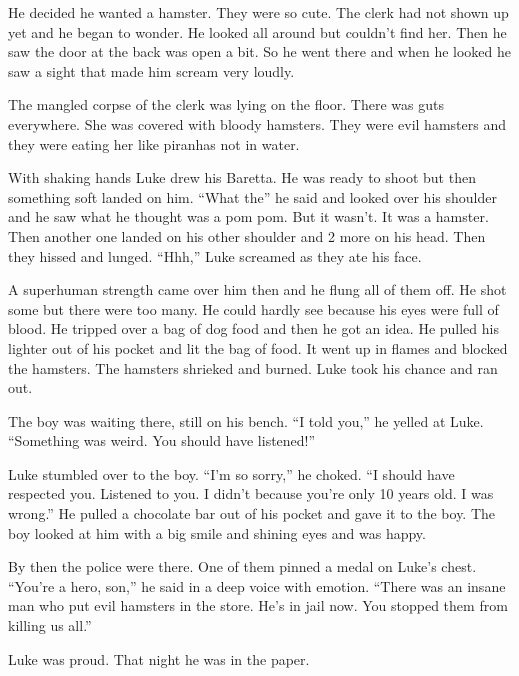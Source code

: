 He decided he wanted a hamster. They were so cute. The clerk had
not shown up yet and he began to wonder. He looked all around but
couldn't find her. Then he saw the door at the back was open a bit.
So he went there and when he looked he saw a sight that made him
scream very loudly.



The mangled corpse of the clerk was lying on the floor. There was
guts everywhere. She was covered with bloody hamsters. They were
evil hamsters and they were eating her like piranhas not in
water.



With shaking hands Luke drew his Baretta. He was ready to shoot but
then something soft landed on him. ``What the'' he said and looked
over his shoulder and he saw what he thought was a pom pom. But it
wasn't. It was a hamster. Then another one landed on his other
shoulder and 2 more on his head. Then they hissed and lunged.
``Hhh,'' Luke screamed as they ate his face.



A superhuman strength came over him then and he flung all of them
off. He shot some but there were too many. He could hardly see
because his eyes were full of blood. He tripped over a bag of dog
food and then he got an idea. He pulled his lighter out of his
pocket and lit the bag of food. It went up in flames and blocked
the hamsters. The hamsters shrieked and burned. Luke took his
chance and ran out.



The boy was waiting there, still on his bench. ``I told you,'' he
yelled at Luke. ``Something was weird. You should have
listened!''



Luke stumbled over to the boy. ``I'm so sorry,'' he choked. ``I should
have respected you. Listened to you. I didn't because you're only
10 years old. I was wrong.'' He pulled a chocolate bar out of his
pocket and gave it to the boy. The boy looked at him with a big
smile and shining eyes and was happy.



By then the police were there. One of them pinned a medal on Luke's
chest. ``You're a hero, son,'' he said in a deep voice with emotion.
``There was an insane man who put evil hamsters in the store. He's
in jail now. You stopped them from killing us all.''



Luke was proud. That night he was in the paper.



